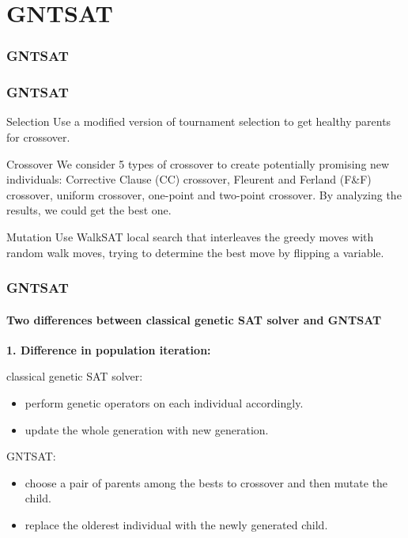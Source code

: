 \section{GNTSAT}

\begin{frame}
	\frametitle{GNTSAT}
\begin{small}
	\renewcommand{\thealgocf}{}
	\begin{algorithm}[H]
		\SetAlgoLined
		\BlankLine
		\caption{GNTSAT solver}
	\end{algorithm}
\end{small}
\end{frame}


\begin{frame}
	\frametitle{GNTSAT}
	\begin{block}{Selection}
		Use a modified version of tournament selection to get healthy parents for crossover.
	\end{block}
	\begin{block}{Crossover}
	We consider 5 types of crossover to create potentially promising new individuals: Corrective Clause (CC) crossover,
	Fleurent and Ferland (F\&F) crossover, uniform crossover, one-point and two-point crossover. By analyzing the results, we could get the best one.
	\end{block}
	\begin{block}{Mutation}
		Use WalkSAT local search that interleaves the greedy moves with random walk moves, trying to determine the best move by flipping a variable.
	\end{block}
\end{frame}
\begin{frame}[t]
	\frametitle{GNTSAT}
	\framesubtitle{Two differences between classical genetic SAT solver and GNTSAT}
	\textbf{1. Difference in population iteration:}
	\begin{alertblock}{classical genetic SAT solver:}
		\begin{itemize}
		\item perform genetic operators on each individual accordingly.
		\item update the whole generation with new generation.
		\end{itemize}
	\end{alertblock}
	\begin{alertblock}{GNTSAT:}		
		\begin{itemize}
		\item choose a pair of parents among the bests to crossover and then mutate the child. 
		\item replace the olderest individual with the newly generated child.
		\end{itemize}	
	\end{alertblock}
\end{frame}

